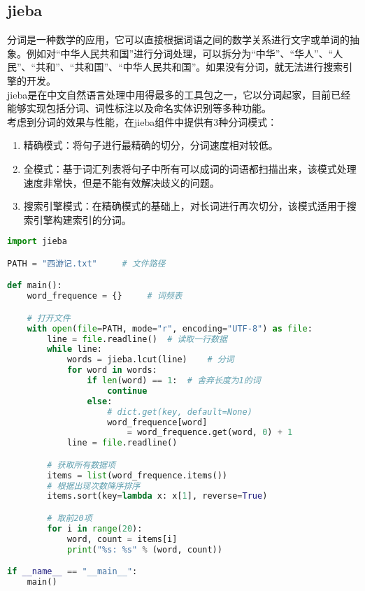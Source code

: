 \subsection{jieba}

分词是一种数学的应用，它可以直接根据词语之间的数学关系进行文字或单词的抽象。例如对“中华人民共和国”进行分词处理，可以拆分为“中华”、“华人”、“人民”、“共和”、“共和国”、“中华人民共和国”。如果没有分词，就无法进行搜索引擎的开发。\\

jieba是在中文自然语言处理中用得最多的工具包之一，它以分词起家，目前已经能够实现包括分词、词性标注以及命名实体识别等多种功能。\\

考虑到分词的效果与性能，在jieba组件中提供有3种分词模式：

\begin{enumerate}
	\item 精确模式：将句子进行最精确的切分，分词速度相对较低。

	\item 全模式：基于词汇列表将句子中所有可以成词的词语都扫描出来，该模式处理速度非常快，但是不能有效解决歧义的问题。

	\item 搜索引擎模式：在精确模式的基础上，对长词进行再次切分，该模式适用于搜索引擎构建索引的分词。
\end{enumerate}

\vspace{0.5cm}


\begin{lstlisting}[language=Python]
import jieba

PATH = "西游记.txt"     # 文件路径

def main():
    word_frequence = {}     # 词频表

    # 打开文件
    with open(file=PATH, mode="r", encoding="UTF-8") as file:
        line = file.readline()  # 读取一行数据
        while line:
            words = jieba.lcut(line)    # 分词
            for word in words:
                if len(word) == 1:  # 舍弃长度为1的词
                    continue
                else:
                    # dict.get(key, default=None)
                    word_frequence[word] 
                        = word_frequence.get(word, 0) + 1
            line = file.readline()

        # 获取所有数据项
        items = list(word_frequence.items())
        # 根据出现次数降序排序
        items.sort(key=lambda x: x[1], reverse=True)

        # 取前20项
        for i in range(20):
            word, count = items[i]
            print("%s: %s" % (word, count))

if __name__ == "__main__":
    main()
\end{lstlisting}

\newpage